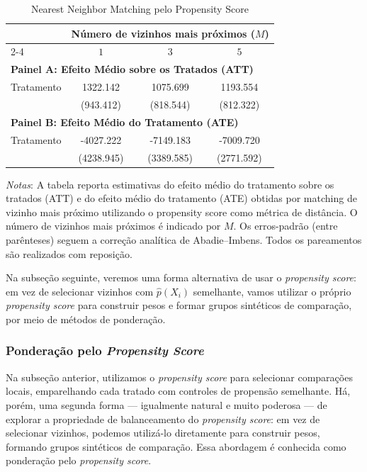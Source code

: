 \begin{table}[htbp]
\centering
\caption{Nearest Neighbor Matching pelo Propensity Score}
\label{tab:nn_pscore_trimmed}
\begin{tabular}{lccc}
\toprule
 & \multicolumn{3}{c}{Número de vizinhos mais próximos ($M$)} \\
\cmidrule(lr){2-4}
 & $1$ & $3$ & $5$ \\
\midrule
\multicolumn{4}{l}{\textbf{Painel A: Efeito Médio sobre os Tratados (ATT)}} \\
\midrule
Tratamento 
& 1322.142 
& 1075.699 
& 1193.554 \\
 
& (943.412) 
& (818.544) 
& (812.322) \\
\midrule
\multicolumn{4}{l}{\textbf{Painel B: Efeito Médio do Tratamento (ATE)}} \\
\midrule
Tratamento 
& -4027.222 
& -7149.183 
& -7009.720 \\
 
& (4238.945) 
& (3389.585) 
& (2771.592) \\
\bottomrule
\end{tabular}

\begin{flushleft}
\footnotesize
\textit{Notas}: A tabela reporta estimativas do efeito médio do tratamento sobre os tratados (ATT) e do efeito médio do tratamento (ATE) obtidas por matching de vizinho mais próximo utilizando o propensity score como métrica de distância. O número de vizinhos mais próximos é indicado por $M$. Os erros-padrão (entre parênteses) seguem a correção analítica de Abadie--Imbens. Todos os pareamentos são realizados com reposição.
\end{flushleft}\label{nnps}
\end{table}


Na subseção seguinte, veremos uma forma alternativa de usar o \textit{propensity score}: em vez de selecionar vizinhos com $\hat{p}(X_i)$ semelhante, vamos utilizar o próprio \textit{propensity score} para construir pesos e formar grupos sintéticos de comparação, por meio de métodos de ponderação.

\subsubsection{Ponderação pelo \textit{Propensity Score}}

Na subseção anterior, utilizamos o \textit{propensity score} para selecionar comparações locais, emparelhando cada tratado com controles de propensão semelhante. Há, porém, uma segunda forma — igualmente natural e muito poderosa — de explorar a propriedade de balanceamento do \textit{propensity score}: em vez de selecionar vizinhos, podemos utilizá-lo diretamente para construir pesos, formando grupos sintéticos de comparação. Essa abordagem é conhecida como ponderação pelo \textit{propensity score}.

